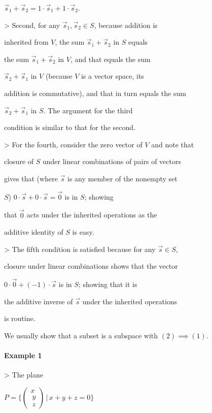         $\vec{s}_1+\vec{s}_2=1\cdot\vec{s}_1+1\cdot\vec{s}_2$.

    >   Second, for any $\vec{s}_1,\vec{s}_2\in S$, because addition is

        inherited from $V$, the sum $\vec{s}_1+\vec{s}_2$ in $S$ equals

        the sum $\vec{s}_1+\vec{s}_2$ in $V$, and that equals the sum

        $\vec{s}_2+\vec{s}_1$ in $V$ (because $V$ is a vector space, its

        addition is commutative), and that in turn equals the sum

        $\vec{s}_2+\vec{s}_1$ in $S$. The argument for the third

        condition is similar to that for the second.

    >   For the fourth, consider the zero vector of $V$ and note that

        closure of $S$ under linear combinations of pairs of vectors

        gives that (where $\vec{s}$ is any member of the nonempty set

        $S$) $0\cdot\vec{s}+0\cdot\vec{s}=\vec{0}$ is in $S$; showing

        that $\vec{0}$ acts under the inherited operations as the

        additive identity of $S$ is easy.

    >   The fifth condition is satisfied because for any $\vec{s}\in S$,

        closure under linear combinations shows that the vector

        $0\cdot\vec{0}+(-1)\cdot\vec{s}$ is in $S$; showing that it is

        the additive inverse of $\vec{s}$ under the inherited operations

        is routine.



We usually show that a subset is a subspace with $(2)\implies (1)$.



\paragraph{Example 1}



>   The plane

    $P=\{\begin{pmatrix} x \\\     y \\\     z \end{pmatrix}\,\big|\, x+y+z=0\}$

